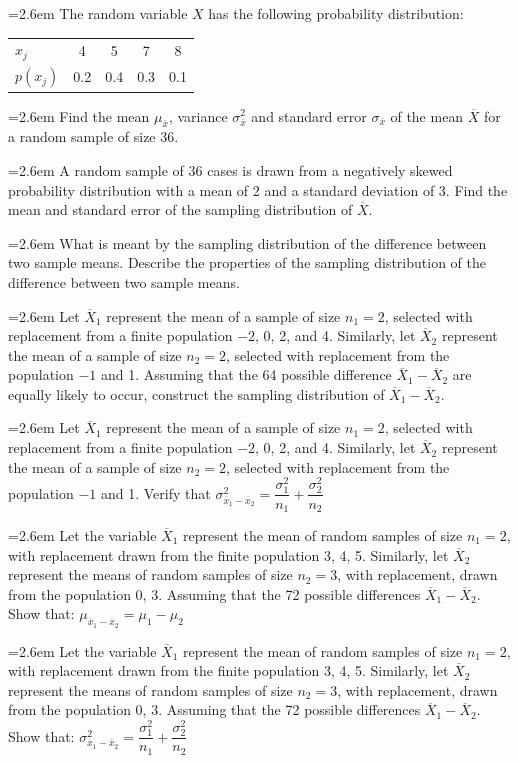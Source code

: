 \documentclass[11pt,a4paper]{article}
\newcommand{\Q}[2]{\par\smallskip\noindent\hangindent=2.6em\hangafter=1
  \makebox[2.6em][l]{\textbf{#1.}}#2\par}
\newcommand{\cont}[1]{\par\noindent\hangindent=2.6em\hangafter=-100 #1}
\newcommand{\dtab}[2]{\par\smallskip\noindent\hspace*{2.6em}\begin{tabular}{#1}\hline #2\\ \hline\end{tabular}\par\smallskip}
\begin{document}
\Q{95}{The random variable $X$ has the following probability distribution:\dtab{|l@{\hspace{2.5em}}c@{\hspace{2.5em}}c@{\hspace{2.5em}}c@{\hspace{2.5em}}c|}{$x_{j}$ & 4 & 5 & 7 & 8 \\ $p(x_{j})$ & 0.2 & 0.4 & 0.3 & 0.1}\cont{Find the mean $\mu_{\overline{x}}$, variance $\sigma^{2}_{\overline{x}}$ and standard error $\sigma_{\overline{x}}$ of the mean $\overline{X}$ for a random sample of size 36.}}
\Q{96}{A random sample of 36 cases is drawn from a negatively skewed probability distribution with a mean of 2 and a standard deviation of 3. Find the mean and standard error of the sampling distribution of $\overline{X}$.}
\Q{97}{What is meant by the sampling distribution of the difference between two sample means. Describe the properties of the sampling distribution of the difference between two sample means.}
\Q{98}{Let $\overline{X}_{1}$ represent the mean of a sample of size $n_{1}=2$, selected with replacement from a finite population $-2$, 0, 2, and 4. Similarly, let $\overline{X}_{2}$ represent the mean of a sample of size $n_{2}=2$, selected with replacement from the population $-1$ and 1. Assuming that the 64 possible difference $\overline{X}_{1}-\overline{X}_{2}$ are equally likely to occur, construct the sampling distribution of $\overline{X}_{1}-\overline{X}_{2}$.}
\Q{99}{Let $\overline{X}_{1}$ represent the mean of a sample of size $n_{1}=2$, selected with replacement from a finite population $-2$, 0, 2, and 4. Similarly, let $\overline{X}_{2}$ represent the mean of a sample of size $n_{2}=2$, selected with replacement from the population $-1$ and 1. Verify that $\sigma^{2}_{\overline{x}_{1}-\overline{x}_{2}}=\dfrac{\sigma_{1}^{2}}{n_{1}}+\dfrac{\sigma_{2}^{2}}{n_{2}}$}
\Q{100}{Let the variable $\overline{X}_{1}$ represent the mean of random samples of size $n_{1}=2$, with replacement drawn from the finite population 3, 4, 5. Similarly, let $\overline{X}_{2}$ represent the means of random samples of size $n_{2}=3$, with replacement, drawn from the population 0, 3. Assuming that the 72 possible differences $\overline{X}_{1}-\overline{X}_{2}$. Show that: $\mu_{\overline{x}_{1}-\overline{x}_{2}}=\mu_{1}-\mu_{2}$}
\Q{101}{Let the variable $\overline{X}_{1}$ represent the mean of random samples of size $n_{1}=2$, with replacement drawn from the finite population 3, 4, 5. Similarly, let $\overline{X}_{2}$ represent the means of random samples of size $n_{2}=3$, with replacement, drawn from the population 0, 3. Assuming that the 72 possible differences $\overline{X}_{1}-\overline{X}_{2}$. Show that: $\sigma^{2}_{\overline{x}_{1}-\overline{x}_{2}}=\dfrac{\sigma_{1}^{2}}{n_{1}}+\dfrac{\sigma_{2}^{2}}{n_{2}}$}
\end{document}
